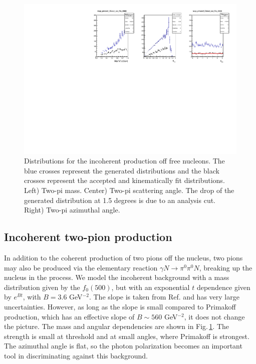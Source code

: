\begin{figure}[tbp]
\begin{center}
\includegraphics[width=16cm,clip=true]{figures/twopi_primakoff_DSelect_test_File_20000_IC.pdf}
\caption{Distributions for the incoherent production off free nucleons. The blue crosses represent the generated distributions and the black crosses represent the accepted and kinematically fit distributions.
Left) Two-pi mass. Center) Two-pi scattering angle. The drop of the generated distribution at 1.5 degrees is due to an analysis cut. Right) Two-pi azimuthal angle.
\label{fig:IC}}
\end{center} 
\end{figure}

\subsection{Incoherent two-pion production}
In addition to the coherent production of two pions off the nucleus, two pions may also be produced via the elementary reaction $\gamma N\to \pi^0 \pi^0 N$, breaking up the nucleus in the process. We model the incoherent background with a mass distribution given by the $f_0(500)$, but with an exponential $t$ dependence given by $e^{Bt}$, with $B=3.6$ GeV$^{-2}$. The slope is taken from Ref.\cite{Battaglieri:2009aa} and has very large uncertainties. However, as long as the slope is small compared to Primakoff production, which has an effective slope of $B\sim560$ GeV$^{-2}$, it does not change the picture. The mass and angular dependencies are shown in Fig.\,\ref{fig:IC}. The strength is small at threshold and at small angles, where Primakoff is strongest. The azimuthal angle is flat, so the photon polarization becomes an important tool in discriminating against this background. 

